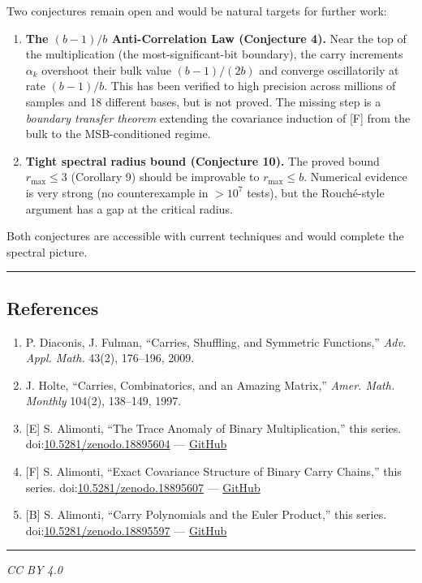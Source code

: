 \documentclass[
  11pt,
]{article}
\providecommand{\tightlist}{%
  \setlength{\itemsep}{0pt}\setlength{\parskip}{0pt}}
\begin{document}
Two conjectures remain open and would be natural targets for further work:

\begin{enumerate}
\def\labelenumi{\arabic{enumi}.}
\item
  \textbf{The \((b-1)/b\) Anti-Correlation Law (Conjecture 4).} Near the top of
  the multiplication (the most-significant-bit boundary), the carry increments
  \(\alpha_k\) overshoot their bulk value \((b-1)/(2b)\) and converge
  oscillatorily at rate \((b-1)/b\). This has been verified to high precision
  across millions of samples and 18 different bases, but is not proved. The
  missing step is a \emph{boundary transfer theorem} extending the covariance
  induction of {[}F{]} from the bulk to the MSB-conditioned regime.
\item
  \textbf{Tight spectral radius bound (Conjecture 10).} The proved bound
  \(r_{\max} \leq 3\) (Corollary 9) should be improvable to \(r_{\max} \leq b\).
  Numerical evidence is very strong (no counterexample in \(>10^7\) tests), but
  the Rouché-style argument has a gap at the critical radius.
\end{enumerate}

Both conjectures are accessible with current techniques and would complete the
spectral picture.

\begin{center}\rule{0.5\linewidth}{0.5pt}\end{center}

\newpage

\subsection{References}\label{references}

\begin{enumerate}
\def\labelenumi{\arabic{enumi}.}
\tightlist
\item
  P. Diaconis, J. Fulman, ``Carries, Shuffling, and Symmetric Functions,''
  \emph{Adv. Appl. Math.} 43(2), 176--196, 2009.
\item
  J. Holte, ``Carries, Combinatorics, and an Amazing Matrix,'' \emph{Amer. Math.
  Monthly} 104(2), 138--149, 1997.
\item
  {[}E{]} S. Alimonti, ``The Trace Anomaly of Binary Multiplication,'' this
  series.
  doi:\href{https://doi.org/10.5281/zenodo.18895604}{10.5281/zenodo.18895604}
  ---
  \href{https://github.com/stefanoalimonti/carry-arithmetic-E-trace-anomaly}{GitHub}
\item
  {[}F{]} S. Alimonti, ``Exact Covariance Structure of Binary Carry Chains,''
  this series.
  doi:\href{https://doi.org/10.5281/zenodo.18895607}{10.5281/zenodo.18895607}
  ---
  \href{https://github.com/stefanoalimonti/carry-arithmetic-F-covariance-structure}{GitHub}
\item
  {[}B{]} S. Alimonti, ``Carry Polynomials and the Euler Product,'' this series.
  doi:\href{https://doi.org/10.5281/zenodo.18895597}{10.5281/zenodo.18895597}
  ---
  \href{https://github.com/stefanoalimonti/carry-arithmetic-B-zeta-approximation}{GitHub}
\end{enumerate}

\begin{center}\rule{0.5\linewidth}{0.5pt}\end{center}

\emph{CC BY 4.0}
\end{document}
